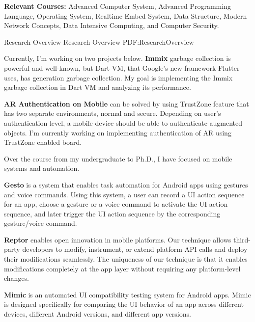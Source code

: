 \documentclass[letterpaper,MMMyyyy,nonstopmode]{simpleresumecv}
\begin{document}
\begin{Body}
\BigGap
\Entry
\textbf{Relevant Courses:} Advanced Computer System, Advanced Programming Language, Operating System, Realtime Embed System,
Data Structure, Modern Network Concepts, Data Intensive Computing,  and Computer Security.


\Section
{Research Overview}
{Research Overview}
{PDF:ResearchOverview}

\Entry
Currently, I'm working on two projects below.
\Gap
\BulletItem
\textbf{Immix} garbage collection is powerful and well-known, but Dart VM, that Google's 
new framework Flutter uses, has generation garbage collection. My goal is implementing the Immix garbage 
collection in Dart VM and analyzing its performance.
\hfill

\Gap
\BulletItem
\textbf{AR Authentication on Mobile} can be solved by using TrustZone feature that has two separate environments, 
normal and secure. Depending on user's authentication level, a mobile device should be able to authenticate 
augmented objects. I'm currently working on implementing authentication of AR using TrustZone enabled board. 
\hfill

\Entry
Over the course from my undergraduate to Ph.D., I have focused on mobile systems and automation.

\Gap
\BulletItem
\textbf{Gesto} is a system that enables task automation for Android apps using gestures 
and voice commands. Using this system, a user can record a UI action sequence for an app, 
choose a gesture or a voice command to activate the UI action sequence, and later trigger 
the UI action sequence by the corresponding gesture/voice command.
\hfill

\Gap
\BulletItem
\textbf{Reptor} enables open innovation in mobile platforms. Our technique allows third-party 
developers to modify, instrument, or extend platform API calls and deploy their modifications 
seamlessly. The uniqueness of our technique is that it enables modifications completely at 
the app layer without requiring any platform-level changes. 
\hfill

\Gap
\BulletItem
\textbf{Mimic} is an automated UI compatibility testing system for Android apps. 
Mimic is designed specifically for comparing the UI behavior of an app across different 
devices, different Android versions, and different app versions.
\hfill




\end{Body}
\end{document}
